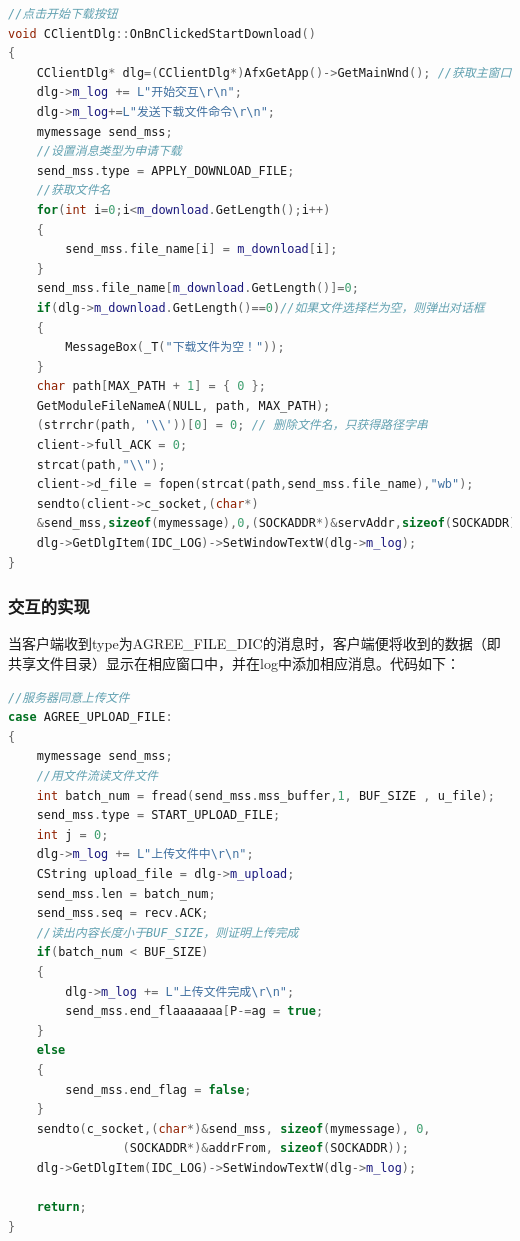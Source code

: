 \begin{flushleft}
\begin{lstlisting}[language={C++},basicstyle=\footnotesize]
//点击开始下载按钮
void CClientDlg::OnBnClickedStartDownload()
{
	CClientDlg* dlg=(CClientDlg*)AfxGetApp()->GetMainWnd(); //获取主窗口
	dlg->m_log += L"开始交互\r\n";
	dlg->m_log+=L"发送下载文件命令\r\n";
	mymessage send_mss;
	//设置消息类型为申请下载
	send_mss.type = APPLY_DOWNLOAD_FILE;
	//获取文件名
	for(int i=0;i<m_download.GetLength();i++)
	{
		send_mss.file_name[i] = m_download[i];
	}
	send_mss.file_name[m_download.GetLength()]=0;
	if(dlg->m_download.GetLength()==0)//如果文件选择栏为空，则弹出对话框
	{
		MessageBox(_T("下载文件为空！"));
	}
	char path[MAX_PATH + 1] = { 0 };
	GetModuleFileNameA(NULL, path, MAX_PATH);
	(strrchr(path, '\\'))[0] = 0; // 删除文件名，只获得路径字串
	client->full_ACK = 0;
	strcat(path,"\\");
	client->d_file = fopen(strcat(path,send_mss.file_name),"wb");
	sendto(client->c_socket,(char*)
    &send_mss,sizeof(mymessage),0,(SOCKADDR*)&servAddr,sizeof(SOCKADDR));
	dlg->GetDlgItem(IDC_LOG)->SetWindowTextW(dlg->m_log);
}
\end{lstlisting}
\end{flushleft}


\subsubsection{交互的实现}

当客户端收到type为AGREE\_FILE\_DIC的消息时，客户端便将收到的数据（即共享文件目录）显示在相应窗口中，并在log中添加相应消息。代码如下：

\begin{flushleft}
\begin{lstlisting}[language={C++},basicstyle=\footnotesize]
//服务器同意上传文件
case AGREE_UPLOAD_FILE:
{
	mymessage send_mss;
	//用文件流读文件文件
	int batch_num = fread(send_mss.mss_buffer,1, BUF_SIZE , u_file);
	send_mss.type = START_UPLOAD_FILE;
	int j = 0;
	dlg->m_log += L"上传文件中\r\n";
	CString upload_file = dlg->m_upload;
	send_mss.len = batch_num;
	send_mss.seq = recv.ACK;
	//读出内容长度小于BUF_SIZE，则证明上传完成
	if(batch_num < BUF_SIZE)
	{
		dlg->m_log += L"上传文件完成\r\n";
		send_mss.end_flaaaaaaa[P-=ag = true;
	}
	else
	{
		send_mss.end_flag = false;
	}
	sendto(c_socket,(char*)&send_mss, sizeof(mymessage), 0,
				(SOCKADDR*)&addrFrom, sizeof(SOCKADDR));
	dlg->GetDlgItem(IDC_LOG)->SetWindowTextW(dlg->m_log);
	
	return;
}
\end{lstlisting}
\end{flushleft}


